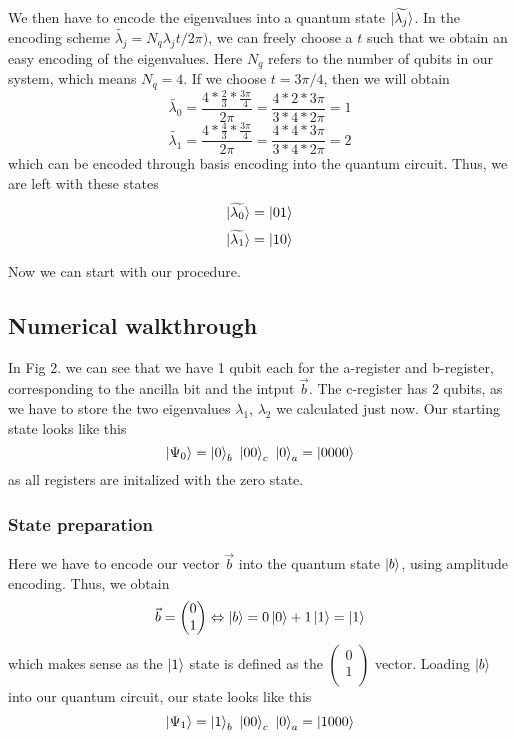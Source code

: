 We then have to encode the eigenvalues into a quantum state $\ket{\widetilde{\lambda_j}}$.
In the encoding scheme $\widetilde{\lambda_j} = N_q\lambda_jt/2\pi)$, we can freely choose a $t$ such that we obtain an easy encoding of the eigenvalues. 
Here $N_q$ refers to the number of qubits in our system, which means $N_q = 4$.
If we choose $t = 3\pi/4$, then we will obtain
\begin{equation}
\widetilde{\lambda_0} =\frac{4*\frac{2}{3}*\frac{3\pi}{4}}{2 \pi} =\frac{4*2*3\pi}{3*4* 2 \pi} = 1
\end{equation}
\begin{equation}
\widetilde{\lambda_1} =\frac{4*\frac{4}{3}*\frac{3\pi}{4}}{2 \pi} =\frac{4*4*3\pi}{3*4* 2 \pi} = 2
\end{equation}
which can be encoded through basis encoding into the quantum circuit.
Thus, we are left with these states
\begin{equation}
\ket{\widetilde{\lambda_0}} = \ket{01}
\end{equation}
\begin{equation}
\ket{\widetilde{\lambda_1}} = \ket{10}
\end{equation}

Now we can start with our procedure.

\subsection{Numerical walkthrough}
In Fig 2. we can see that we have 1 qubit each for the a-register and b-register, corresponding to the ancilla bit and the intput $\vec b$.
The c-register has 2 qubits, as we have to store the two eigenvalues $\lambda_1$, $\lambda_2$ we calculated just now.
Our starting state looks like this
\begin{equation}
\ket{\Psi_0} = \ket{0}_b\ \ket{00}_c\ \ket{0}_a = \ket{0000}
\end{equation}
as all registers are initalized with the zero state.

\subsubsection{State preparation}
    Here we have to encode our vector $\vec{b}$ into the quantum state $\ket{b}$, using amplitude encoding.
    Thus, we obtain
    \begin{equation}
    \vec{b} = \begin{pmatrix} 0\\ 1\\ \end{pmatrix}
    \Leftrightarrow \ket{b} = 0 \ket{0} + 1 \ket{1} = \ket{1} 
    \end{equation}
    which makes sense as the $\ket 1$ state is defined as the $\begin{pmatrix} 0\\ 1\\ \end{pmatrix}$ vector.
    Loading $\ket b$ into our quantum circuit, our state looks like this
    \begin{equation}
    \ket{\Psi_1} = \ket{1}_b\ \ket{00}_c\ \ket{0}_a = \ket{1000}
    \end{equation}

